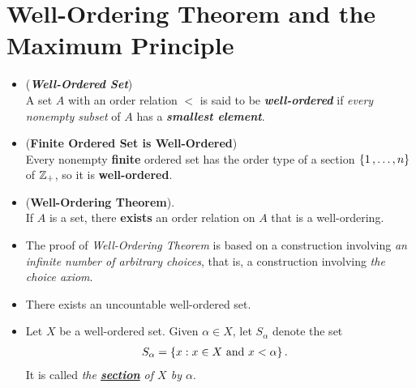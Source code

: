 \documentclass[11pt]{article}
\begin{document}
\section{Well-Ordering Theorem and the Maximum Principle}
\begin{itemize}
\item \begin{definition} (\emph{\textbf{Well-Ordered Set}}) \\
A set $A$ with an order relation $<$ is said to be \emph{\textbf{well-ordered}} if \emph{every nonempty subset} of $A$ has a \emph{\textbf{smallest element}}.
\end{definition}

\item \begin{proposition} (\textbf{Finite Ordered Set is Well-Ordered}) \citep{munkres2000topology} \\
Every nonempty \textbf{finite} ordered set has the order type of a section $\{1 \,{,}\ldots{,}\, n\}$ of ${\mathbb Z}_{+}$, so it is \textbf{well-ordered}.
\end{proposition}

\item \begin{theorem} (\textbf{Well-Ordering Theorem}). \citep{munkres2000topology} \\
If $A$ is a set, there \textbf{exists} an order relation on $A$ that is a well-ordering.
\end{theorem}

\item \begin{remark}
The proof of \emph{Well-Ordering Theorem} is based on a construction involving \textit{an infinite number of arbitrary choices}, that is, a construction involving \emph{the choice axiom}.
\end{remark}

\item \begin{corollary}
There exists an uncountable well-ordered set.
\end{corollary}

\item \begin{definition}
Let $X$ be a well-ordered set. Given $\alpha \in X$, let $S_{\alpha}$ denote the set
\begin{align*}
S_{\alpha} &= \left\{x: x\in X \text{ and } x <\alpha\right\}.
\end{align*}
It is called \emph{the \underline{\textbf{section}} of $X$ by $\alpha$}.
\end{definition}


\end{itemize}
\end{document}
